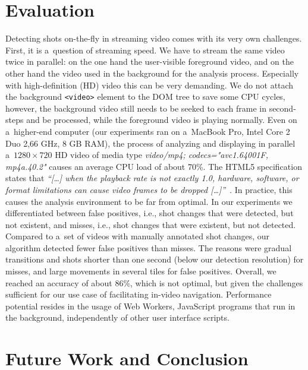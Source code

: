 \section{Evaluation} \label{sec:evaluation}
Detecting shots on-the-fly in streaming video comes with its very own challenges. First, it is a~question of streaming speed. We have to stream the same video twice in parallel: on the one hand the user-visible foreground video, and on the other hand the video used in the background for the analysis process. Especially with high-definition (HD) video this can be very demanding. We do not attach the background \texttt{<video>} element to the DOM tree to save some CPU cycles, however, the background video still needs to be seeked to each frame in second-steps and be processed, while the foreground video is playing normally. Even on a~higher-end computer (our experiments ran on a~MacBook Pro, Intel Core 2 Duo 2,66 GHz, 8 GB RAM), the process of analyzing and displaying in parallel a~$\mathit{1280} \times \mathit{720}$ HD video of media type \emph{video/mp4; codecs="avc1.64001F, mp4a.40.2"} causes an average CPU load of about 70\%. The HTML5 specification states that \textit{``[\ldots] when the playback rate is not exactly 1.0, hardware, software, or format limitations can cause video frames to be dropped [\ldots]''}~\cite{whatwgvideo}. In practice, this causes the analysis environment to be far from optimal. In our experiments we differentiated between false positives, i.e., shot changes that were detected, but not existent, and misses, i.e., shot changes that were existent, but not detected. Compared to a~set of videos with manually annotated shot changes, our algorithm detected fewer false positives than misses. The reasons were gradual transitions and shots shorter than one second (below our detection resolution) for misses, and large movements in several tiles for false positives. Overall, we reached an accuracy of about 86\%, which is not optimal, but given the challenges sufficient for our use case of facilitating in-video navigation. 
Performance potential resides in the usage of Web Workers,
JavaScript programs that run in the background, independently of other user interface scripts.

\section{Future Work and Conclusion} \label{sec:future-work-conclusion}

